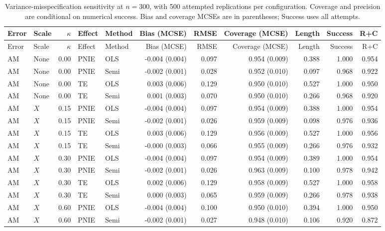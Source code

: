 \begingroup\small\setlength{\tabcolsep}{3pt}
\begin{longtable}{llrllrrrrrr}
\caption{Variance-misspecification sensitivity at $n=300$, with 500 attempted replications per configuration. Coverage and precision are conditional on numerical success. Bias and coverage MCSEs are in parentheses; Success uses all attempts.}\label{tab:variance-sensitivity}\\
\toprule
Error & Scale & $\kappa$ & Effect & Method & Bias (MCSE) & RMSE & Coverage (MCSE) & Length & Success & R+C\\
\midrule\endfirsthead
\toprule
Error & Scale & $\kappa$ & Effect & Method & Bias (MCSE) & RMSE & Coverage (MCSE) & Length & Success & R+C\\
\midrule\endhead
\bottomrule\endfoot
AM & None & 0.00 & PNIE & OLS & -0.004 (0.004) & 0.097 & 0.954 (0.009) & 0.388 & 1.000 & 0.954\\
AM & None & 0.00 & PNIE & Semi & -0.002 (0.001) & 0.028 & 0.952 (0.010) & 0.097 & 0.968 & 0.922\\
AM & None & 0.00 & TE & OLS & 0.003 (0.006) & 0.129 & 0.950 (0.010) & 0.527 & 1.000 & 0.950\\
AM & None & 0.00 & TE & Semi & 0.001 (0.003) & 0.070 & 0.950 (0.010) & 0.266 & 0.968 & 0.920\\
AM & $X$ & 0.15 & PNIE & OLS & -0.004 (0.004) & 0.097 & 0.954 (0.009) & 0.388 & 1.000 & 0.954\\
AM & $X$ & 0.15 & PNIE & Semi & -0.002 (0.001) & 0.026 & 0.959 (0.009) & 0.098 & 0.976 & 0.936\\
AM & $X$ & 0.15 & TE & OLS & 0.003 (0.006) & 0.129 & 0.956 (0.009) & 0.527 & 1.000 & 0.956\\
AM & $X$ & 0.15 & TE & Semi & -0.000 (0.003) & 0.066 & 0.955 (0.009) & 0.266 & 0.976 & 0.932\\
AM & $X$ & 0.30 & PNIE & OLS & -0.004 (0.004) & 0.097 & 0.954 (0.009) & 0.389 & 1.000 & 0.954\\
AM & $X$ & 0.30 & PNIE & Semi & -0.002 (0.001) & 0.026 & 0.963 (0.009) & 0.100 & 0.978 & 0.942\\
AM & $X$ & 0.30 & TE & OLS & 0.002 (0.006) & 0.129 & 0.958 (0.009) & 0.527 & 1.000 & 0.958\\
AM & $X$ & 0.30 & TE & Semi & 0.000 (0.003) & 0.065 & 0.959 (0.009) & 0.266 & 0.978 & 0.938\\
AM & $X$ & 0.60 & PNIE & OLS & -0.004 (0.004) & 0.100 & 0.950 (0.010) & 0.394 & 1.000 & 0.950\\
AM & $X$ & 0.60 & PNIE & Semi & -0.002 (0.001) & 0.027 & 0.948 (0.010) & 0.106 & 0.920 & 0.872\\

\end{longtable}
